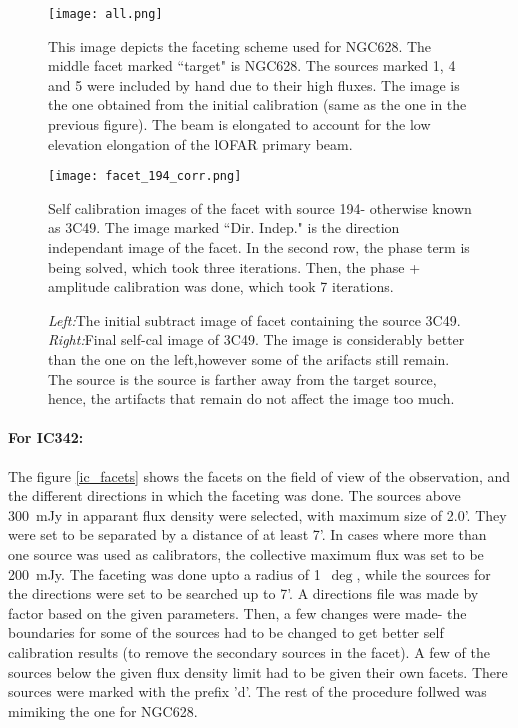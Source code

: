 \documentclass[../main/thesis_msc.tex]{subfiles}
\begin{document}
\begin{figure}[h]
\centering
\texttt{[image: all.png]}
\caption{This image depicts the faceting scheme used for NGC628. The middle facet marked ``target" is NGC628. The sources marked 1, 4 and 5 were included by hand due to their high fluxes. The image is the one obtained from the initial calibration (same as the one in the previous figure). The beam is elongated to account for the low elevation elongation of the lOFAR primary beam.}
\label{all}
\end{figure}

\begin{figure}[h]
\centering
\texttt{[image: facet\_194\_corr.png]}
\caption{Self calibration images of the facet with source 194- otherwise known as 3C49. The image marked ``Dir. Indep." is the direction independant image of the facet. In the second row, the phase term is being solved, which took three iterations. Then, the phase + amplitude calibration was done, which took 7 iterations. }
\label{corr}
\end{figure}

\begin{figure}[h]
	\centering
	\caption{\textit{Left:}The initial subtract image of facet containing the source 3C49. \textit{Right:}Final self-cal image of 3C49. The image is considerably better than the one on the left,however some of the arifacts still remain. The source is the source is farther away from the target source, hence, the artifacts that remain do not affect the image too much.}
	\label{faceting}
	\end{figure}

\paragraph{For IC342:} The figure \ref{ic_facets} shows the facets on the field of view of the observation, and the different directions in which the faceting was done. The sources above 300~mJy in apparant flux density were selected, with maximum size of 2.0'. They were set to be separated by a distance of at least 7'. In cases where more than one source was used as calibrators, the collective maximum flux was set to be 200~mJy. The faceting was done upto a radius of 1~$\deg$, while the sources for the directions were set to be searched up to 7'. A directions file was made by factor based on the given parameters. Then, a few changes were made- the boundaries for some of the sources had to be changed to get better self calibration results (to remove the secondary sources in the facet). A few of the sources below the given flux density limit had to be given their own facets. There sources were marked with the prefix 'd'. The rest of the procedure follwed was mimiking the one for NGC628.\\
\end{document}
